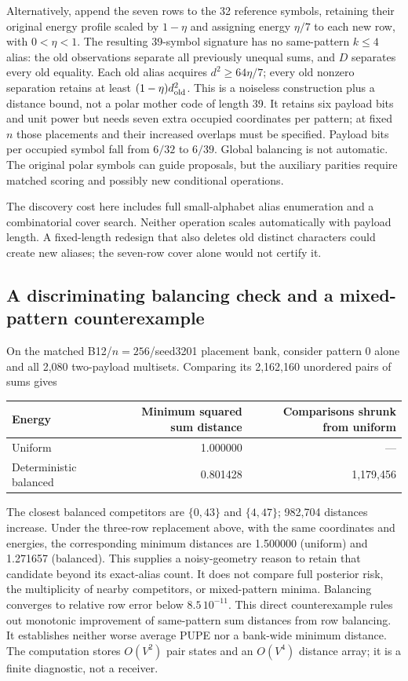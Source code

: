 \documentclass[10pt,a4paper]{article}
\begin{document}
Alternatively, append the seven rows to the 32 reference symbols, retaining their original energy profile
scaled by $1-\eta$ and assigning energy $\eta/7$ to each new row, with $0<\eta<1$.
The resulting 39-symbol signature has no same-pattern $k\leq4$ alias: the old observations separate
all previously unequal sums, and $D$ separates every old equality. Each old alias acquires
$d^2\geq64\eta/7$; every old nonzero separation retains at least $(1-\eta)d_{\rm old}^2$.
This is a noiseless construction plus a distance bound, not a polar mother code of length 39.
It retains six payload bits and unit power but needs seven extra occupied coordinates per pattern;
at fixed $n$ those placements and their increased overlaps must be specified. Payload bits per occupied
symbol fall from $6/32$ to $6/39$. Global balancing is not automatic. The original polar symbols can
guide proposals, but the auxiliary parities require matched scoring and possibly new conditional operations.

The discovery cost here includes full small-alphabet alias enumeration and a combinatorial cover search.
Neither operation scales automatically with payload length. A fixed-length redesign that also deletes
old distinct characters could create new aliases; the seven-row cover alone would not certify it.

\subsection{A discriminating balancing check and a mixed-pattern counterexample}
On the matched B12/$n=256$/seed3201 placement bank, consider pattern 0 alone and all 2,080 two-payload
multisets. Comparing its 2,162,160 unordered pairs of sums gives
\begin{center}
\begin{tabular}{@{}lrr@{}}\toprule
Energy & Minimum squared sum distance & Comparisons shrunk from uniform\\\midrule
Uniform & 1.000000 & ---\\
Deterministic balanced & 0.801428 & 1,179,456\\\bottomrule
\end{tabular}
\end{center}
The closest balanced competitors are $\{0,43\}$ and $\{4,47\}$; 982,704 distances increase.
Under the three-row replacement above, with the same coordinates and energies, the corresponding
minimum distances are 1.500000 (uniform) and 1.271657 (balanced). This supplies a noisy-geometry
reason to retain that candidate beyond its exact-alias count. It does not compare full posterior risk,
the multiplicity of nearby competitors, or mixed-pattern minima.
Balancing converges to relative row error below $8.5\,10^{-11}$. This direct counterexample rules out
monotonic improvement of same-pattern sum distances from row balancing. It establishes neither worse
average PUPE nor a bank-wide minimum distance. The computation stores $O(V^2)$ pair states and an
$O(V^4)$ distance array; it is a finite diagnostic, not a receiver.
\end{document}
